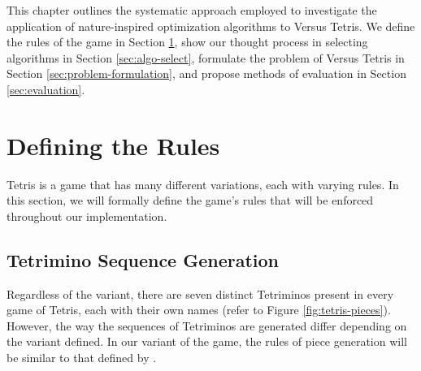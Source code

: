 \documentclass[a4paper, 12pt]{extreport}
\begin{document}
	This chapter outlines the systematic approach employed to investigate the application of nature-inspired optimization algorithms to Versus Tetris. We define the rules of the game in Section \ref{sec:rules}, show our thought process in selecting algorithms in Section \ref{sec:algo-select}, formulate the problem of Versus Tetris in Section \ref{sec:problem-formulation}, and propose methods of evaluation in Section \ref{sec:evaluation}.
	
	\section{Defining the Rules}\label{sec:rules}
	Tetris is a game that has many different variations, each with varying rules. In this section, we will formally define the game's rules that will be enforced throughout our implementation.
	
	\subsection{Tetrimino Sequence Generation}
	
	Regardless of the variant, there are seven distinct Tetriminos present in every game of Tetris, each with their own names (refer to Figure \ref{fig:tetris-pieces}). However, the way the sequences of Tetriminos are generated differ depending on the variant defined. In our variant of the game, the rules of piece generation will be similar to that defined by \citeauthor{tetris-drl-2} \cite{tetris-drl-2}.
	
\end{document}
